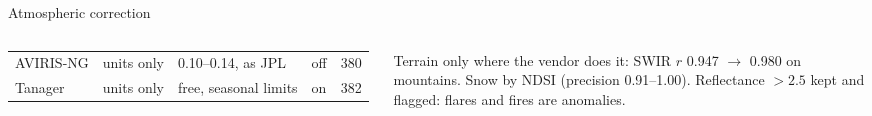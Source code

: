 \documentclass[aspectratio=169,10pt]{beamer}
\newcommand{\tx}[1]{{\fontsize{6.6}{7.9}\selectfont #1\par}}
\begin{document}
\begin{frame}{Atmospheric correction}
\begin{columns}[T,onlytextwidth]
{\begin{tabular}{@{}l>{\raggedright}p{19mm}>{\raggedright}p{15mm}>{\raggedright}p{11mm}r@{}}
AVIRIS-NG & units only & 0.10--0.14, as JPL & off & 380\\
Tanager & units only & free, seasonal limits & on & 382\\
\bottomrule
\end{tabular}}\par
\vspace{0.6mm}
\tx{Terrain only where the vendor does it: SWIR $r$ 0.947 $\to$ 0.980 on mountains. Snow by NDSI (precision 0.91--1.00). Reflectance $>2.5$ kept and flagged: flares and fires are anomalies.}
\end{columns}
\end{frame}
\end{document}
